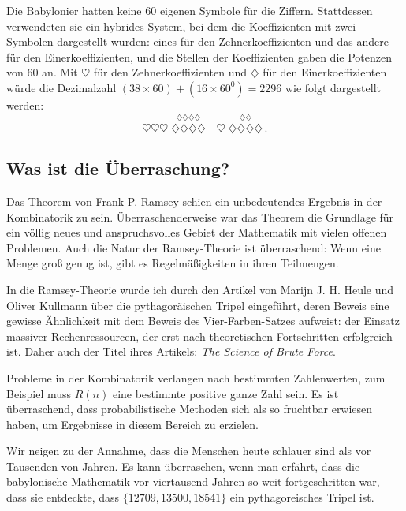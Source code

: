 Die Babylonier hatten keine $60$ eigenen Symbole für die Ziffern. Stattdessen verwendeten sie ein hybrides System, bei dem die Koeffizienten mit zwei Symbolen dargestellt wurden: eines für den Zehnerkoeffizienten und das andere für den Einerkoeffizienten, und die Stellen der Koeffizienten gaben die Potenzen von $60$ an. Mit $\heartsuit$ für den Zehnerkoeffizienten und $\diamondsuit$ für den Einerkoeffizienten würde die Dezimalzahl $(38\times 60)+(16\times 60^0)=2296$ wie folgt dargestellt werden:
\[
\heartsuit\heartsuit\heartsuit \; \stackrel{\displaystyle\diamondsuit\diamondsuit\diamondsuit\diamondsuit}{\diamondsuit\diamondsuit\diamondsuit\diamondsuit}
\quad
\heartsuit \; \stackrel{\displaystyle\diamondsuit\diamondsuit}{\diamondsuit\diamondsuit\diamondsuit\diamondsuit}\,.
\]


\subsection*{Was ist die Überraschung?}

Das Theorem von Frank P. Ramsey schien ein unbedeutendes Ergebnis in der Kombinatorik zu sein. Überraschenderweise war das Theorem die Grundlage für ein völlig neues und anspruchsvolles Gebiet der Mathematik mit vielen offenen Problemen. Auch die Natur der Ramsey-Theorie ist überraschend: Wenn eine Menge groß genug ist, gibt es Regelmäßigkeiten in ihren Teilmengen.

In die Ramsey-Theorie wurde ich durch den Artikel von Marijn J. H. Heule und Oliver Kullmann über die pythagoräischen Tripel eingeführt, deren Beweis eine gewisse Ähnlichkeit mit dem Beweis des Vier-Farben-Satzes aufweist: der Einsatz massiver Rechenressourcen, der erst nach theoretischen Fortschritten erfolgreich ist. Daher auch der Titel ihres Artikels: \textit{The Science of Brute Force}.

Probleme in der Kombinatorik verlangen nach bestimmten Zahlenwerten, zum Beispiel muss $R(n)$ eine bestimmte positive ganze Zahl sein. Es ist überraschend, dass probabilistische Methoden sich als so fruchtbar erwiesen haben, um Ergebnisse in diesem Bereich zu erzielen.

Wir neigen zu der Annahme, dass die Menschen heute schlauer sind als vor Tausenden von Jahren. Es kann überraschen, wenn man erfährt, dass die babylonische Mathematik vor viertausend Jahren so weit fortgeschritten war, dass sie entdeckte, dass $\{12709, 13500, 18541\}$ ein pythagoreisches Tripel ist.

